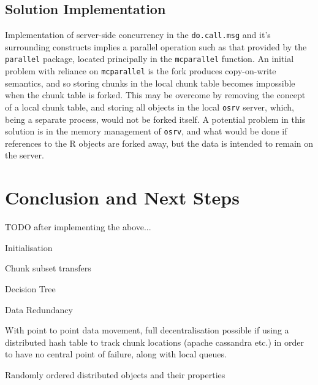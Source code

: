 \documentclass[a4paper,10pt]{article}
\begin{document}
\subsection{Solution Implementation}

Implementation of server-side concurrency in the
\lstinline[language=R]{do.call.msg} and it's surrounding constructs implies a
parallel operation such as that provided by the \texttt{parallel} package,
located principally in the \lstinline[language=R]{mcparallel} function.
An initial problem with reliance on \lstinline[language=R]{mcparallel} is the
fork produces copy-on-write semantics, and so storing chunks in the local chunk
table becomes impossible when the chunk table is forked.
This may be overcome by removing the concept of a local chunk table, and
storing all objects in the local \texttt{osrv} server, which, being a separate
process, would not be forked itself. 
A potential problem in this solution is in the memory management of
\texttt{osrv}, and what would be done if references to the R objects are forked
away, but the data is intended to remain on the server.

\section{Conclusion and Next Steps}

TODO after implementing the above...

Initialisation

Chunk subset transfers

Decision Tree

Data Redundancy

With point to point data movement, full decentralisation possible if using a
distributed hash table to track chunk locations (apache cassandra etc.) in
order to have no central point of failure, along with local queues.

Randomly ordered distributed objects and their properties

\printbibliography
\end{document}
